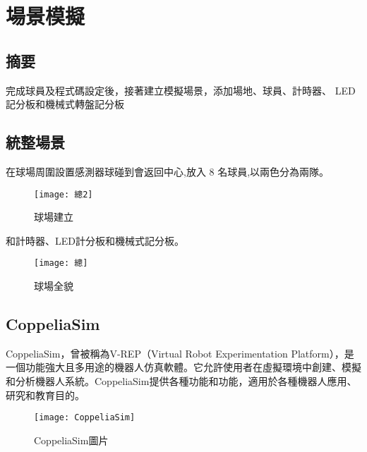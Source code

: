 \chapter{場景模擬}
\renewcommand{\baselinestretch}{10.0} %
\setcounter{page}{7}  %
\fontsize{14pt}{2.5pt}\sectionef
\section{摘要}
  完成球員及程式碼設定後，接著建立模擬場景，添加場地、球員、計時器、 LED 記分板和機械式轉盤記分板\\
\section{統整場景}
  在球場周圍設置感測器球碰到會返回中心,放入 8 名球員,以兩色分為兩隊。\\
\begin{figure}[hbt!]
\begin{center}
\texttt{[image: 總2]}
\caption{\Large 球場建立}\label{總2}
\end{center}
\end{figure}

  和計時器、LED計分板和機械式記分板。\\
\begin{figure}[hbt!]
\begin{center}
\texttt{[image: 總]}
\caption{\Large 球場全貌}\label{總}
\end{center}
\end{figure}
\section{ CoppeliaSim}
  CoppeliaSim，曾被稱為V-REP（Virtual Robot Experimentation Platform），是一個功能強大且多用途的機器人仿真軟體。它允許使用者在虛擬環境中創建、模擬和分析機器人系統。CoppeliaSim提供各種功能和功能，適用於各種機器人應用、研究和教育目的。\\
\begin{figure}[hbt!]
\begin{center}
\texttt{[image: CoppeliaSim]}
\caption{\Large CoppeliaSim圖片}\label{CoppeliaSim}
\end{center}
\end{figure}
\renewcommand{\baselinestretch}{1} %